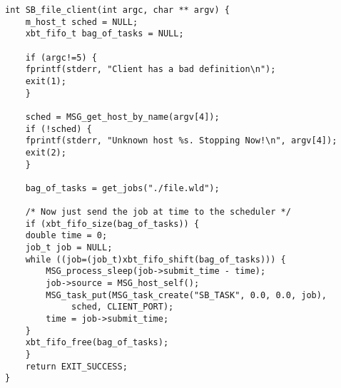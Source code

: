 {\small
\begin{verbatim}
int SB_file_client(int argc, char ** argv) {
    m_host_t sched = NULL;
    xbt_fifo_t bag_of_tasks = NULL;

    if (argc!=5) {
	fprintf(stderr, "Client has a bad definition\n");
	exit(1);
    }
    
    sched = MSG_get_host_by_name(argv[4]);
    if (!sched) {
	fprintf(stderr, "Unknown host %s. Stopping Now!\n", argv[4]);
	exit(2);
    }

    bag_of_tasks = get_jobs("./file.wld");
    
    /* Now just send the job at time to the scheduler */
    if (xbt_fifo_size(bag_of_tasks)) {
	double time = 0;
	job_t job = NULL;
	while ((job=(job_t)xbt_fifo_shift(bag_of_tasks))) {   
	    MSG_process_sleep(job->submit_time - time);
	    job->source = MSG_host_self();
	    MSG_task_put(MSG_task_create("SB_TASK", 0.0, 0.0, job), 
			 sched, CLIENT_PORT);
	    time = job->submit_time;
	}
	xbt_fifo_free(bag_of_tasks);
    }
    return EXIT_SUCCESS;
}
\end{verbatim}
}
